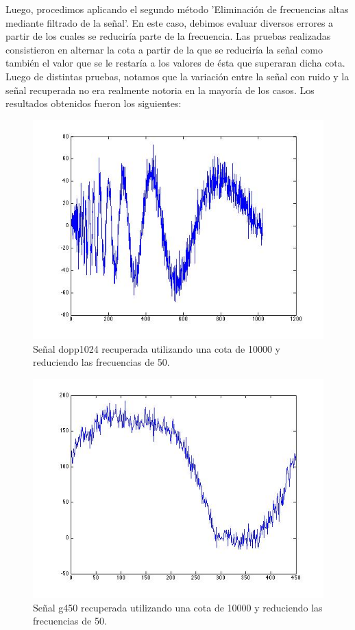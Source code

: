\documentclass[10pt, a4paper]{article}
\begin{document}
\begin{itemize}
Luego, procedimos aplicando el segundo método 'Eliminación de frecuencias altas mediante filtrado de la señal'. En este caso, debimos evaluar diversos errores a partir de los cuales se reduciría parte de la frecuencia. Las pruebas realizadas consistieron en alternar la cota a partir de la que se reduciría la señal como también el valor que se le restaría a los valores de ésta que superaran dicha cota. Luego de distintas pruebas, notamos que la variación entre la señal con ruido y la señal recuperada no era realmente notoria en la mayoría de los casos. Los resultados obtenidos fueron los siguientes:

\begin{figure}[H] %
\begin{center}
\includegraphics[width=350pt]{./dopp1024_recu_f2.jpg}
\caption[h]{Señal dopp1024 recuperada utilizando una cota de 10000 y reduciendo las frecuencias de 50.}
\end{center}
\end{figure}

\begin{figure}[H] %
\begin{center}
\includegraphics[width=350pt]{./g450_recu_f2.jpg}
\caption[h]{Señal g450 recuperada utilizando una cota de 10000 y reduciendo las frecuencias de 50.}
\end{center}
\end{figure}


\end{itemize}
\end{document}
